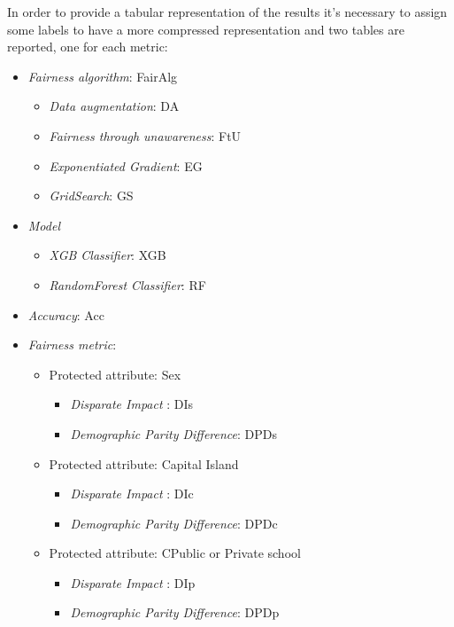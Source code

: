 In order to provide a tabular representation of the results it's necessary to assign some labels to have a more compressed representation and two tables are reported, one for each metric:

\begin{itemize}
    \item \emph{Fairness algorithm}: FairAlg
    \begin{itemize}
        \item \emph{Data augmentation}: DA
        \item \emph{Fairness through unawareness}: FtU
        \item \emph{Exponentiated Gradient}: EG
        \item \emph{GridSearch}: GS
    \end{itemize}
    \item \emph{Model}
    \begin{itemize}
        \item \emph{XGB Classifier}: XGB
        \item \emph{RandomForest Classifier}: RF
    \end{itemize}
    \item \emph{Accuracy}: Acc
    \item \emph{Fairness metric}:
    \begin{itemize}
        \item Protected attribute: Sex
        \begin{itemize}
            \item \emph{Disparate Impact }: DIs
            \item \emph{Demographic Parity Difference}: DPDs
        \end{itemize}
        \item Protected attribute: Capital Island
        \begin{itemize}
            \item \emph{Disparate Impact }: DIc
            \item \emph{Demographic Parity Difference}: DPDc
        \end{itemize}
        \item Protected attribute: CPublic or Private school
        \begin{itemize}
            \item \emph{Disparate Impact }: DIp
            \item \emph{Demographic Parity Difference}: DPDp
        \end{itemize}

\end{itemize}
\end{itemize}
